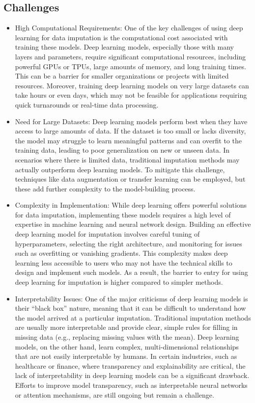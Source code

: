 \documentclass{article}
\begin{document}
\subsection{Challenges}
\begin{itemize} 
\item High Computational Requirements:
One of the key challenges of using deep learning for data imputation is the computational cost associated with training these models. Deep learning models, especially those with many layers and parameters, require significant computational resources, including powerful GPUs or TPUs, large amounts of memory, and long training times. This can be a barrier for smaller organizations or projects with limited resources. Moreover, training deep learning models on very large datasets can take hours or even days, which may not be feasible for applications requiring quick turnarounds or real-time data processing.

\item Need for Large Datasets:
Deep learning models perform best when they have access to large amounts of data. If the dataset is too small or lacks diversity, the model may struggle to learn meaningful patterns and can overfit to the training data, leading to poor generalization on new or unseen data. In scenarios where there is limited data, traditional imputation methods may actually outperform deep learning models. To mitigate this challenge, techniques like data augmentation or transfer learning can be employed, but these add further complexity to the model-building process.

\item Complexity in Implementation:
While deep learning offers powerful solutions for data imputation, implementing these models requires a high level of expertise in machine learning and neural network design. Building an effective deep learning model for imputation involves careful tuning of hyperparameters, selecting the right architecture, and monitoring for issues such as overfitting or vanishing gradients. This complexity makes deep learning less accessible to users who may not have the technical skills to design and implement such models. As a result, the barrier to entry for using deep learning for imputation is higher compared to simpler methods.

\item Interpretability Issues:
One of the major criticisms of deep learning models is their “black box” nature, meaning that it can be difficult to understand how the model arrived at a particular imputation. Traditional imputation methods are usually more interpretable and provide clear, simple rules for filling in missing data (e.g., replacing missing values with the mean). Deep learning models, on the other hand, learn complex, multi-dimensional relationships that are not easily interpretable by humans. In certain industries, such as healthcare or finance, where transparency and explainability are critical, the lack of interpretability in deep learning models can be a significant drawback. Efforts to improve model transparency, such as interpretable neural networks or attention mechanisms, are still ongoing but remain a challenge.
\end{itemize}
\end{document}
